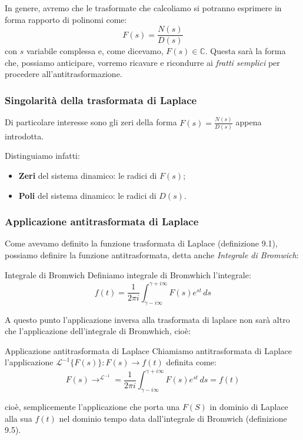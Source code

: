 \documentclass[a4paper,11pt]{article}
\begin{document}
In genere, avremo che le trasformate che calcoliamo si potranno esprimere in forma rapporto di polinomi come:
$$
F(s) = \frac{N(s)}{D(s)}
$$
con $s$ variabile complessa e, come dicevamo, $F(s) \in \mathbb{C}$.
Questa sarà la forma che, possiamo anticipare, vorremo ricavare e ricondurre ai \textit{fratti semplici} per procedere all'antitrasformazione.

\subsubsection{Singolarità della trasformata di Laplace}
Di particolare interesse sono gli zeri della forma 
$
F(s) = \frac{N(s)}{D(s)}
$
appena introdotta.

Distinguiamo infatti:
\begin{itemize}
	\item \textbf{Zeri} del sistema dinamico: le radici di $F(s)$;
	\item \textbf{Poli} del sistema dinamico: le radici di $D(s)$.
\end{itemize}

\subsubsection{Applicazione antitrasformata di Laplace}
Come avevamo definito la funzione trasformata di Laplace (definizione 9.1), possiamo definire la funzione antitrasformata, detta anche \textit{Integrale di Bromwich}:
\begin{definition}{Integrale di Bromwich}
	Definiamo integrale di Bromwhich l'integrale:
	$$
		f(t) = \frac{1}{2 \pi i} \int_{\gamma - i \infty}^{\gamma + i \infty} F(s) e^{st} \, ds
	$$
\end{definition}

A questo punto l'applicazione inversa alla trasformata di laplace non sarà altro che l'applicazione dell'integrale di Bromwhich, cioè:
\begin{definition}{Applicazione antitrasformata di Laplace}
	Chiamiamo antitrasformata di Laplace l'applicazione $\mathcal{L}^{-1}\{F(s)\} : F(s) \rightarrow f(t)$ definita come:
	$$
	F(s) \rightarrow^{\mathcal{L}^{-1}} = 	
		\frac{1}{2 \pi i} \int_{\gamma - i \infty}^{\gamma + i \infty} F(s) e^{st} \, ds = f(t)
		$$
\end{definition}
cioè, semplicemente l'applicazione che porta una $F(S)$ in dominio di Laplace alla sua $f(t)$ nel dominio tempo data dall'integrale di Bromwich (definizione 9.5).

\par\smallskip
\end{document}
